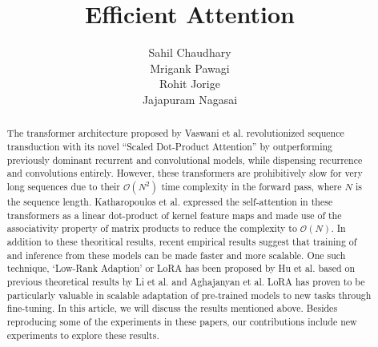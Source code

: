 \documentclass{article}
\title{Efficient Attention}
\author{
  Sahil Chaudhary \\
  \And
  Mrigank Pawagi \\
  \And
  Rohit Jorige \\
  \And
  Jajapuram Nagasai \\
}
\newcommand{\todo}[1]{\textcolor{red}{#1}}
\begin{document}
\maketitle


\begin{abstract}

    The transformer architecture proposed by Vaswani et al. revolutionized sequence transduction with its novel ``Scaled Dot-Product Attention'' by outperforming previously dominant recurrent and convolutional models, while dispensing recurrence and convolutions entirely. However, these transformers are prohibitively slow for very long sequences due to their $\mathcal{O}(N^2)$ time complexity in the forward pass, where $N$ is the sequence length. Katharopoulos et al. expressed the self-attention in these transformers as a linear dot-product of kernel feature maps and made use of the associativity property of matrix products to reduce the complexity to $\mathcal{O}(N)$. In addition to these theoritical results, recent empirical results suggest that training of and inference from these models can be made faster and more scalable. One such technique, `Low-Rank Adaption' or LoRA has been proposed by Hu et al. based on previous theoretical results by Li et al. and Aghajanyan et al. LoRA has proven to be particularly valuable in scalable adaptation of pre-trained models to new tasks through fine-tuning. In this article, we will discuss the results mentioned above. Besides reproducing some of the experiments in these papers, our contributions include new experiments to explore these results. 
   

\end{abstract}
\end{document}
